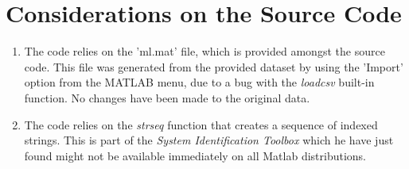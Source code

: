 \chapter{Considerations on the Source Code}\label{ch:appAlabel}

\begin{enumerate}
\item The code relies on the 'ml.mat' file, which is provided amongst the source code. This file was generated from the provided dataset by using the 'Import' option from the MATLAB menu, due to a bug with the \textit{loadcsv} built-in function. No changes have been made to the original data.
\item The code relies on the \textit{strseq} function that creates a sequence of indexed strings. This is part of the \textit{System Identification Toolbox} which he have just found might not be available immediately on all Matlab distributions.
\end{enumerate}